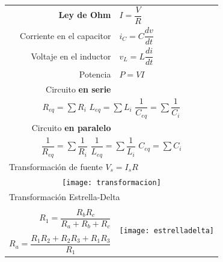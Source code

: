 \documentclass[11pt,a4paper,twocolumn]{article}
\begin{document}
	\begin{tcolorbox}[colback=white!97!brown, colframe=brown!15!gray]
		
		\begin{tabular}{r l}
			\textbf{Ley de Ohm} & $I=\dfrac{V}{R}$ \\
\vspace{.1cm}	Corriente en el capacitor & $i_{C}=C \dfrac{dv}{dt}$ \\
\vspace{.1cm}	Voltaje en el inductor & $v_{L}=L \dfrac{di}{dt}$ \\
\vspace{.1cm}	Potencia & $P =VI$ \\

	Circuito \textbf{en serie} & \\
	\multicolumn{2}{c}{$R_{eq}=\displaystyle\sum R_i$ \hspace{.3cm} $L_{eq}=\displaystyle\sum L_i$ \hspace{.3cm} \vspace{.1cm} $\dfrac{1}{C_{eq}}=\displaystyle\sum \dfrac{1}{C_i}$}\\

		Circuito \textbf{en paralelo}&\\
		 \multicolumn{2}{c}{\vspace{.2cm}$\dfrac{1}{R_{eq}}=\displaystyle\sum \dfrac{1}{R_i}$ \hspace{.3cm} $\dfrac{1}{L_{eq}}=\displaystyle\sum \dfrac{1}{L_i}$ \hspace{.3cm} $C_{eq}=\displaystyle\sum C_i$}\\
		

	 \multicolumn{2}{l}{Transformación de fuente \hspace{.2cm} $V_{s}=I_{s}R$} \\
	 		\multicolumn{2}{c}{\hspace{-.5cm} \texttt{[image: transformacion]} } \\
	 		
	 
	 \multicolumn{2}{l}{Transformación Estrella-Delta} 		\\
														& \multirow{4}{*}{\hspace{-.54cm} \texttt{[image: estrelladelta]} }  \\
		  $R_{1}=\dfrac{R_{b}R_{c}}{R_{a}+R_{b}+R_{c}}$	&   \\ 
														& 	\\
		\hspace{-1cm}$R_{a}=\dfrac{R_{1}R_{2}+R_{2}R_{3}+R_{1}R_{3}}{R_{1}}$ \vspace{.5cm}	& \\
		

\end{tabular}
\end{tcolorbox}
\end{document}
